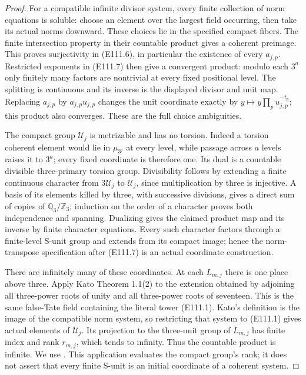 \begin{proof}
For a compatible infinite divisor system, every finite
collection of norm equations is soluble: choose an
element over the largest field occurring, then take
its actual norms downward. These choices lie in the
specified compact fibers. The finite intersection
property in their countable product gives a coherent
preimage. This proves surjectivity in (E111.6), in
particular the existence of every $a_{j,p}$.
Restricted exponents in (E111.7) then give a convergent
product: modulo each $3^a$ only finitely many factors
are nontrivial at every fixed positional level.
The splitting is continuous and its inverse is the
displayed divisor and unit map. Replacing $a_{j,p}$
by $a_{j,p}u_{j,p}$ changes the unit coordinate exactly
by $y\mapsto y\prod_pu_{j,p}^{-t_p}$; this product also
converges. These are the full choice ambiguities.

The compact group $\mathcal U_j$ is metrizable and has
no torsion. Indeed a torsion coherent element would
lie in $\mu_{3^j}$ at every level, while passage across
$a$ levels raises it to $3^a$; every fixed coordinate
is therefore one. Its dual is a countable divisible
three-primary torsion group. Divisibility follows by
extending a finite continuous character from $3\mathcal U_j$
to $\mathcal U_j$, since multiplication by three is
injective. A basis of its elements killed by three,
with successive divisions, gives a direct sum of
copies of $\mathbb Q_3/\mathbb Z_3$; induction on the
order of a character proves both independence and
spanning. Dualizing gives the claimed product map
and its inverse by finite character equations.
Every such character factors through a finite-level
S-unit group and extends from its compact image;
hence the norm-transpose specification after (E111.7)
is an actual coordinate construction.

There are infinitely many of these coordinates.
At each $L_{m,j}$ there is one place above three.
Apply Kato Theorem 1.1(2) to the extension obtained by
adjoining all three-power roots of unity and all
three-power roots of seventeen. This is the same
false-Tate field containing the literal tower (E111.1).
Kato's definition is the image of the compatible norm
system, so restricting that system to (E111.1) gives
actual elements of $\mathcal U_j$. Its projection to
the three-unit group of $L_{m,j}$ has finite index
and rank $r_{m,j}$, which tends to infinity.
Thus the countable product is infinite. We use
\cite[Theorem 1.1(2), the definition preceding it,
and its complete proof in Sections 4--5]{E_KatoUniversalNorms}.
This application evaluates the compact group's rank;
it does not assert that every finite S-unit is an
initial coordinate of a coherent system.


\end{proof}
